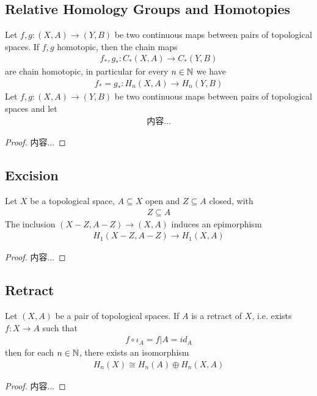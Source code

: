 \documentclass[Total.tex]{subfiles}
\begin{document}
			\subsection{Relative Homology Groups and Homotopies}
			\begin{proposition}
				Let $f,g:(X,A)\rightarrow (Y,B)$ be two continuous maps between pairs of topological spaces. If $f,g$ homotopic, then the chain maps
				\begin{gather*}
					f_*,g_*:C_*(X,A)\rightarrow C_*(Y,B)
				\end{gather*}
				are chain homotopic, in particular for every $n\in \mathbb{N}$ we have
				\begin{gather*}
					f_*=g_*:H_n(X,A)\rightarrow H_n(Y,B)
				\end{gather*}
				Let $f,g:(X,A)\rightarrow (Y,B)$ be two continuous maps between pairs of topological spaces and let
				\begin{gather*}
					内容...
				\end{gather*}
			\end{proposition}
			\begin{proof}
				内容...
			\end{proof}
			\subsection{Excision}
				\begin{proposition}
					Let $X$ be a topological space, $A\subseteq X$ open and $Z\subseteq A$ closed, with
					\begin{gather*}
						Z\subseteq A
					\end{gather*}
					The inclusion $(X-Z,A-Z)\rightarrow (X,A)$ induces an epimorphism
					\begin{gather*}
						H_1(X-Z,A-Z)\rightarrow H_1(X,A)
					\end{gather*}
				\end{proposition}
				\begin{proof}
					内容...
				\end{proof}
			\subsection{Retract}
			\begin{proposition}
				Let $(X,A)$ be a pair of topological spaces. If $A$ is a retract of $X$, i.e. exists $f:X\rightarrow A$ such that
				\begin{gather*}
					f\circ \iota_A=f|A=id_A
				\end{gather*}
				then for each $n\in \mathbb{N}$, there exists an isomorphism
				\begin{gather*}
					H_n(X)\cong H_n(A)\oplus H_n(X,A)
				\end{gather*}
			\end{proposition}
			\begin{proof}
				内容...
			\end{proof}
\end{document}
